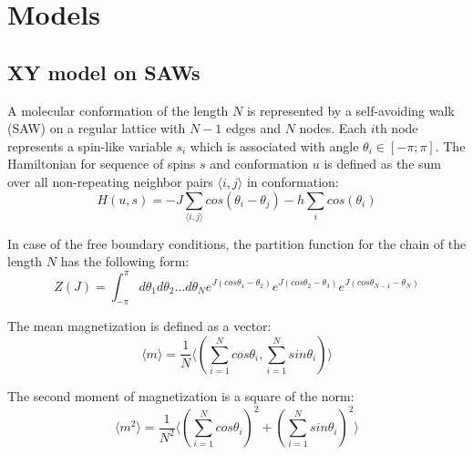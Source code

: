 \chapter{Models} 

\section{XY model on SAWs} \label{sec:xymodel}

A molecular conformation of the length $N$ is represented by a self-avoiding walk (SAW) on a regular lattice with $N-1$ edges and $N$ nodes.  Each $i$th node represents a spin-like variable $s_i$ which is associated with angle $\theta_i \in  [-\pi;\pi]$. The Hamiltonian for sequence of spins $s$ and conformation $u$ is defined as the sum over all  non-repeating neighbor  pairs $\langle i, j \rangle$ in conformation:
\begin{equation}
\label{hamiltonian}
H(u,s) = -J \sum_{ \langle i, j \rangle } cos(\theta_i - \theta_j) - h \sum_i cos(\theta_i)
\end{equation}

In case of the free boundary conditions, the partition function for the chain of the length $N$ has the following form: 
\begin{equation}
\label{partitionfunction_free}
Z(J) = \int_{-\pi}^{\pi} d \theta_1 d \theta_2 \dots d\theta_N
 e ^{J(cos\theta_1-\theta_2)} e ^{J(cos\theta_2-\theta_3)} 
 e ^{J(cos\theta_{N-1}-\theta_N)} %
\end{equation}

The mean magnetization is defined as a vector:
\begin{equation}
\label{meanmagnetization}
\langle m \rangle = \frac{1}{N} \langle ( \sum_{i=1}^{N} cos \theta_i, \sum_{i=1}^{N} sin \theta_i  ) \rangle
\end{equation}

The second moment of magnetization is a square of the norm:
\begin{equation}
\label{secondmomentmagnetization}
\langle m^2 \rangle = \frac{1}{N^2} \langle ( \sum_{i=1}^{N} cos \theta_i )^2 +  (\sum_{i=1}^{N} sin \theta_i  )^2 \rangle
\end{equation}

